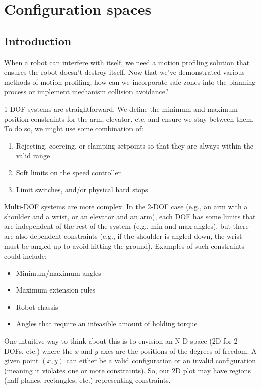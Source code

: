 
\chapter{Configuration spaces}

\section{Introduction}

When a robot can interfere with itself, we need a motion profiling solution that
ensures the robot doesn't destroy itself. Now that we've demonstrated various
methods of motion profiling, how can we incorporate safe zones into the planning
process or implement mechanism collision avoidance?

1-DOF systems are straightforward. We define the minimum and maximum position
constraints for the arm, elevator, etc. and ensure we stay between them. To do
so, we might use some combination of:
\begin{enumerate}
  \item Rejecting, coercing, or clamping setpoints so that they are always
    within the valid range
  \item Soft limits on the speed controller
  \item Limit switches, and/or physical hard stops
\end{enumerate}

Multi-DOF systems are more complex. In the 2-DOF case (e.g., an arm with a
shoulder and a wrist, or an elevator and an arm), each DOF has some limits that
are independent of the rest of the system (e.g., min and max angles), but there
are also dependent constraints (e.g., if the shoulder is angled down, the wrist
must be angled up to avoid hitting the ground). Examples of such constraints
could include:
\begin{itemize}
  \item Minimum/maximum angles
  \item Maximum extension rules
  \item Robot chassis
  \item Angles that require an infeasible amount of holding torque
\end{itemize}

One intuitive way to think about this is to envision an N-D space (2D for 2
DOFs, etc.) where the $x$ and $y$ axes are the positions of the degrees of
freedom. A given point $(x, y)$ can either be a valid configuration or an
invalid configuration (meaning it violates one or more constraints). So, our 2D
plot may have regions (half-planes, rectangles, etc.) representing constraints.

